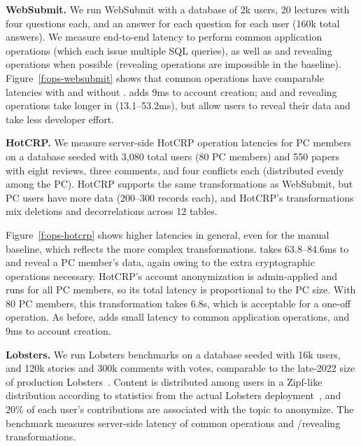 \textbf{WebSubmit.}
%
We run WebSubmit with a database of 2k users, 20 lectures with four questions
each, and an answer for each question for each user (160k total answers).
%
We measure end-to-end latency to perform common application operations (which
each issue multiple SQL queries), as well as \xxing and revealing operations
when possible (revealing operations are impossible in the baseline).
%
%
%
Figure~\ref{f:ops-websubmit} shows that common operations have comparable
latencies with and without \sys.
%
\sys adds 9ms to account creation; and \xxing
and revealing operations take longer in \sys (13.1--53.2ms), but allow users to
reveal their data and take less developer effort.
%

\textbf{HotCRP.}
%
We measure server-side HotCRP operation latencies for PC members on a database seeded with 3,080
total users (80 PC members)
and 550 papers with eight reviews, three comments, and four conflicts each
(distributed evenly among the PC).
%
HotCRP supports the same \xxing transformations as WebSubmit, but PC users have more
data (200--300 records each), and HotCRP's \xxing transformations mix deletions and
decorrelations across 12 tables. %
%

%
Figure~\ref{f:ops-hotcrp} shows higher latencies in general, even for the manual
baseline, which reflects the more complex \xxing transformations.
%
\sys takes 63.8--84.6ms to \xx and reveal a PC member's data, again owing to the
extra cryptographic operations necessary.
%
HotCRP's account anonymization is admin-applied and runs for all PC members, so
its total latency is proportional to the PC size.
%
With 80 PC members, this transformation takes 6.8s, which is acceptable for a
one-off operation.
%
As before, \sys adds small latency to common application operations, and 9ms to
account creation.
%

\textbf{Lobsters.}
%
We run Lobsters benchmarks on a database seeded with 16k users, and
120k stories and 300k comments with votes, comparable to the late-2022 size of
production Lobsters~\cite{lobsters}.
%
Content is distributed among users in a Zipf-like distribution according to
statistics from the actual Lobsters deployment~\cite{lobsters-data}, and 20\% of
each user's contributions are associated with the topic to anonymize.
%
The benchmark measures server-side latency of common operations and
\xxing/revealing transformations.
%
%
%
%

